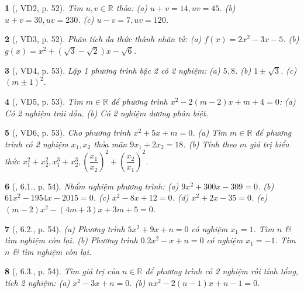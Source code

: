 \documentclass{article}
\newtheorem{baitoan}{}
\begin{document}
\begin{baitoan}[\cite{Binh_boi_duong_Toan_9_tap_2}, VD2, p. 52]
	Tìm $u,v\in\mathbb{R}$ thỏa: (a) $u + v = 14,uv = 45$. (b) $u + v = 30,uv = 230$. (c) $u - v = 7,uv = 120$.
\end{baitoan}

\begin{baitoan}[\cite{Binh_boi_duong_Toan_9_tap_2}, VD3, p. 52]
	Phân tích đa thức thành nhân tử: (a) $f(x) = 2x^2 - 3x - 5$. (b) $g(x) = x^2 + (\sqrt{3} - \sqrt{2})x - \sqrt{6}$.
\end{baitoan}

\begin{baitoan}[\cite{Binh_boi_duong_Toan_9_tap_2}, VD4, p. 53]
	Lập 1 phương trình bậc 2 có 2 nghiệm: (a) $5,8$. (b) $1\pm\sqrt{3}$. (c) $(m\pm1)^2$.
\end{baitoan}

\begin{baitoan}[\cite{Binh_boi_duong_Toan_9_tap_2}, VD5, p. 53]
	Tìm $m\in\mathbb{R}$ để phương trình $x^2 - 2(m - 2)x + m + 4 = 0$: (a) Có 2 nghiệm trái dấu. (b) Có 2 nghiệm dương phân biệt.
\end{baitoan}

\begin{baitoan}[\cite{Binh_boi_duong_Toan_9_tap_2}, VD6, p. 53]
	Cho phương trình $x^2 + 5x + m = 0$. (a) Tìm $m\in\mathbb{R}$ để phương trình có 2 nghiệm $x_1,x_2$ thỏa mãn $9x_1 + 2x_2 = 18$. (b) Tính theo $m$ giá trị biểu thức $x_1^2 + x_2^2,x_1^3 + x_2^3,\left(\dfrac{x_1}{x_2}\right)^2 + \left(\dfrac{x_2}{x_1}\right)^2$.
\end{baitoan}

\begin{baitoan}[\cite{Binh_boi_duong_Toan_9_tap_2}, 6.1., p. 54]
	Nhẩm nghiệm phương trình: (a) $9x^2 + 300x - 309 = 0$. (b) $61x^2 - 1954x - 2015 = 0$. (c) $x^2 - 8x + 12 = 0$. (d) $x^2 + 2x - 35 = 0$. (e) $(m - 2)x^2 - (4m + 3)x + 3m + 5 = 0$.
\end{baitoan}

\begin{baitoan}[\cite{Binh_boi_duong_Toan_9_tap_2}, 6.2., p. 54]
	(a) Phương trình $5x^2 + 9x + n = 0$ có nghiệm $x_1 = 1$. Tìm $n$ \& tìm nghiệm còn lại. (b) Phương trình $0.2x^2 - x + n = 0$ có nghiệm $x_1 = -1$. Tìm $n$ \& tìm nghiệm còn lại.
\end{baitoan}

\begin{baitoan}[\cite{Binh_boi_duong_Toan_9_tap_2}, 6.3., p. 54]
	Tìm giá trị của $n\in\mathbb{R}$ để phương trình có 2 nghiệm rồi tính tổng, tích 2 nghiệm: (a) $x^2 - 3x + n = 0$. (b) $nx^2 - 2(n - 1)x + n - 1 = 0$.
\end{baitoan}
\end{document}
